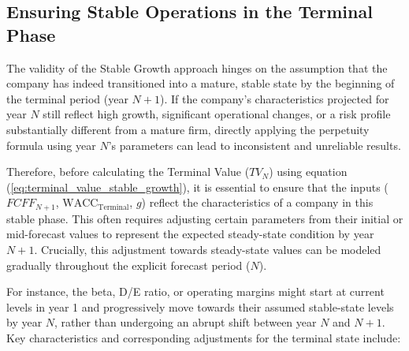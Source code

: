 \subsection{Ensuring Stable Operations in the Terminal Phase} \label{sec:stable_operations_assumptions}
The validity of the Stable Growth approach hinges on the assumption that the company has indeed transitioned into a mature, stable state by the beginning of the terminal period (year \(N+1\)). If the company's characteristics projected for year \(N\) still reflect high growth, significant operational changes, or a risk profile substantially different from a mature firm, directly applying the perpetuity formula using year \(N\)'s parameters can lead to inconsistent and unreliable results.

Therefore, before calculating the Terminal Value (\(TV_N\)) using equation (\ref{eq:terminal_value_stable_growth}), it is essential to ensure that the inputs (\(FCFF_{N+1}\), \(\text{WACC}_{\text{Terminal}}\), \(g\)) reflect the characteristics of a company in this stable phase. This often requires adjusting certain parameters from their initial or mid-forecast values to represent the expected steady-state condition by year \(N+1\). Crucially, this adjustment towards steady-state values can be modeled gradually throughout the explicit forecast period (\(N\)). 

For instance, the beta, D/E ratio, or operating margins might start at current levels in year 1 and progressively move towards their assumed stable-state levels by year \(N\), rather than undergoing an abrupt shift between year \(N\) and \(N+1\). Key characteristics and corresponding adjustments for the terminal state include:

